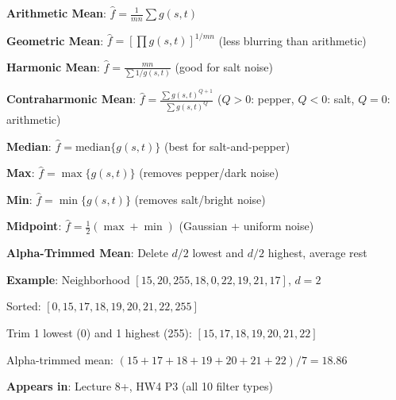\documentclass[10pt]{article}
\begin{document}
\begin{conceptbox}

\begin{formulabox}
\textbf{Arithmetic Mean}: $\hat{f} = \frac{1}{mn}\sum g(s,t)$

\textbf{Geometric Mean}: $\hat{f} = \left[\prod g(s,t)\right]^{1/mn}$ \hfill (less blurring than arithmetic)

\textbf{Harmonic Mean}: $\hat{f} = \frac{mn}{\sum 1/g(s,t)}$ \hfill (good for salt noise)

\textbf{Contraharmonic Mean}: $\hat{f} = \frac{\sum g(s,t)^{Q+1}}{\sum g(s,t)^Q}$ \hfill ($Q>0$: pepper, $Q<0$: salt, $Q=0$: arithmetic)

\textbf{Median}: $\hat{f} = \text{median}\{g(s,t)\}$ \hfill (best for salt-and-pepper)

\textbf{Max}: $\hat{f} = \max\{g(s,t)\}$ \hfill (removes pepper/dark noise)

\textbf{Min}: $\hat{f} = \min\{g(s,t)\}$ \hfill (removes salt/bright noise)

\textbf{Midpoint}: $\hat{f} = \frac{1}{2}(\max + \min)$ \hfill (Gaussian + uniform noise)

\textbf{Alpha-Trimmed Mean}: Delete $d/2$ lowest and $d/2$ highest, average rest
\end{formulabox}

\begin{examplebox}
\textbf{Example}: Neighborhood $[15, 20, 255, 18, 0, 22, 19, 21, 17]$, $d=2$

Sorted: $[0, 15, 17, 18, 19, 20, 21, 22, 255]$

Trim 1 lowest (0) and 1 highest (255): $[15, 17, 18, 19, 20, 21, 22]$

Alpha-trimmed mean: $(15+17+18+19+20+21+22)/7 = 18.86$
\end{examplebox}

\textbf{Appears in}: Lecture 8+, HW4 P3 (all 10 filter types)

\end{conceptbox}

\end{document}
